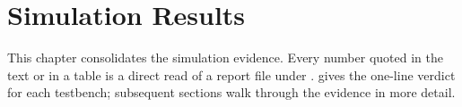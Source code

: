 
\chapter{Simulation Results}
\label{ch:results}

This chapter consolidates the simulation evidence. Every number quoted in
the text or in a table is a direct read of a report file under
.  gives the one-line verdict for
each testbench; subsequent sections walk through the evidence in more
detail.

